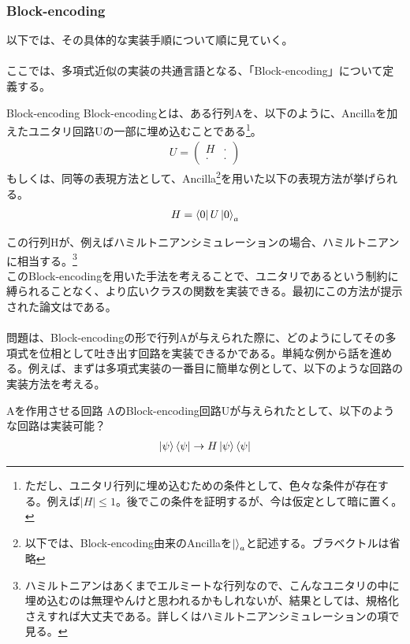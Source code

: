 \documentclass[a4paper,10.5pt]{article}
\numberwithin{equation}{section}
\begin{document}
\subsubsection{Block-encoding}
以下では、その具体的な実装手順について順に見ていく。\\
\\
ここでは、多項式近似の実装の共通言語となる、「Block-encoding」について定義する。
\begin{defbox}{Block-encoding}
Block-encodingとは、ある行列Aを、以下のように、Ancillaを加えたユニタリ回路Uの一部に埋め込むことである\footnote{ただし、ユニタリ行列に埋め込むための条件として、色々な条件が存在する。例えば$|H|\leq 1$。後でこの条件を証明するが、今は仮定として暗に置く。}。
\begin{align*}
    U=\begin{pmatrix}
        H & \cdot \\
        \cdot & \cdot
    \end{pmatrix}
\end{align*}
もしくは、同等の表現方法として、Ancilla\footnote{以下では、Block-encoding由来のAncillaを$\ket{}_{a}$と記述する。ブラベクトルは省略}を用いた以下の表現方法が挙げられる。
\begin{align*}
    H=\bra{0}U\ket{0}_{a}
\end{align*}
\end{defbox}
この行列Hが、例えばハミルトニアンシミュレーションの場合、ハミルトニアンに相当する。\footnote{ハミルトニアンはあくまでエルミートな行列なので、こんなユニタリの中に埋め込むのは無理やんけと思われるかもしれないが、結果としては、規格化さえすれば大丈夫である。詳しくはハミルトニアンシミュレーションの項で見る。}\\
このBlock-encodingを用いた手法を考えることで、ユニタリであるという制約に縛られることなく、より広いクラスの関数を実装できる。最初にこの方法が提示された論文は\cite{Low:2016sck}である。\\
\\
問題は、Block-encodingの形で行列Aが与えられた際に、どのようにしてその多項式を位相として吐き出す回路を実装できるかである。単純な例から話を進める。例えば、まずは多項式実装の一番目に簡単な例として、以下のような回路の実装方法を考える。
\begin{problembox}{Aを作用させる回路}
AのBlock-encoding回路Uが与えられたとして、以下のような回路は実装可能？
\begin{align*}
    \ket{\psi}\bra{\psi}\to H\ket{\psi}\bra{\psi}
\end{align*}
\end{problembox}
\end{document}
